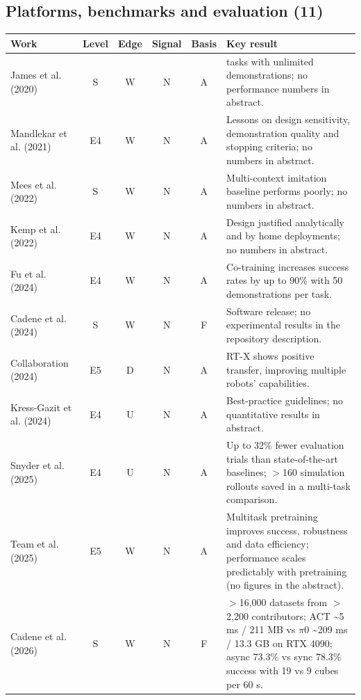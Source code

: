 \documentclass[10pt,a4paper]{article}
\begin{document}
\subsection*{Platforms, benchmarks and evaluation (11)}
\begin{longtable}{@{}>{\raggedright\arraybackslash}p{4.0cm}cccc>{\raggedright\arraybackslash}p{7.6cm}@{}}
\toprule \textbf{Work} & \textbf{Level} & \textbf{Edge} & \textbf{Signal} & \textbf{Basis} & \textbf{Key result} \\ \midrule \endhead
James et al. (2020)~\cite{James2020} & S & W & N & A & 100 tasks with unlimited demonstrations; no performance numbers in abstract. \\
Mandlekar et al. (2021)~\cite{Mandlekar2021} & E4 & W & N & A & Lessons on design sensitivity, demonstration quality and stopping criteria; no numbers in abstract. \\
Mees et al. (2022)~\cite{Mees2022} & S & W & N & A & Multi-context imitation baseline performs poorly; no numbers in abstract. \\
Kemp et al. (2022)~\cite{Kemp2022} & E4 & W & N & A & Design justified analytically and by home deployments; no numbers in abstract. \\
Fu et al. (2024)~\cite{Fu2024} & E4 & W & N & A & Co-training increases success rates by up to 90\% with 50 demonstrations per task. \\
Cadene et al. (2024)~\cite{Cadene2024} & S & W & N & F & Software release; no experimental results in the repository description. \\
Collaboration (2024)~\cite{OXE2024} & E5 & D & N & A & RT-X shows positive transfer, improving multiple robots' capabilities. \\
Kress-Gazit et al. (2024)~\cite{KressGazit2024} & E4 & U & N & A & Best-practice guidelines; no quantitative results in abstract. \\
Snyder et al. (2025)~\cite{Snyder2025} & E4 & U & N & A & Up to 32\% fewer evaluation trials than state-of-the-art baselines; $>$160 simulation rollouts saved in a multi-task comparison. \\
Team et al. (2025)~\cite{TRI2025} & E5 & W & N & A & Multitask pretraining improves success, robustness and data efficiency; performance scales predictably with pretraining (no figures in the abstract). \\
Cadene et al. (2026)~\cite{Cadene2026} & S & W & N & F & $>$16,000 datasets from $>$2,200 contributors; ACT \textasciitilde{}5 ms / 211 MB vs $\pi$0 \textasciitilde{}209 ms / 13.3 GB on RTX 4090; async 73.3\% vs sync 78.3\% success with 19 vs 9 cubes per 60 s. \\
\bottomrule\end{longtable}
\end{document}
